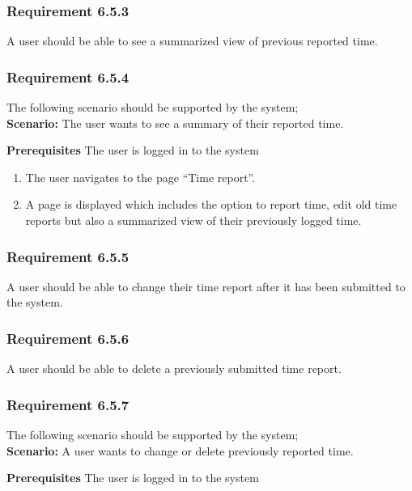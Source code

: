 \documentclass{article}
\begin{document}
\subsubsection{Requirement 6.5.3}
A user should be able to see a summarized view of previous reported time.

\subsubsection{Requirement 6.5.4}
The following scenario should be supported by the system;\\

\textbf{Scenario:} The user wants to see a summary of their reported time.

\textbf{Prerequisites} The user is logged in to the system
\begin{enumerate}


\item The user navigates to the page “Time report”.
\item A page is displayed which includes the option to report time, edit old time reports but also a summarized view of their previously logged time. 
\end{enumerate}

\subsubsection{Requirement 6.5.5}
A user should be able to change their time report after it has been submitted to the system.
\subsubsection{Requirement 6.5.6}
A user should be able to delete a previously submitted time report.
\subsubsection{Requirement 6.5.7}
The following scenario should be supported by the system;\\

\textbf{Scenario:} A user wants to change or delete previously reported time.

\textbf{Prerequisites} The user is logged in to the system
\end{document}
